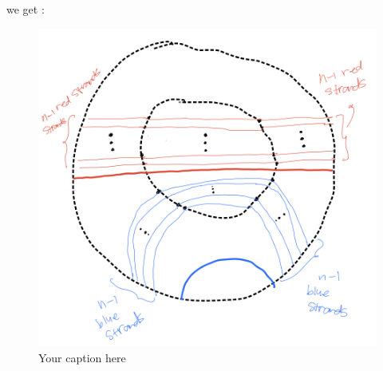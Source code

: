 we get :

\begin{figure}[H] %
    \centering
    \includegraphics[width=\linewidth]{diagrams/definition14-2/5.png} %
    \caption{Your caption here}
    \label{fig:your-label}
\end{figure}